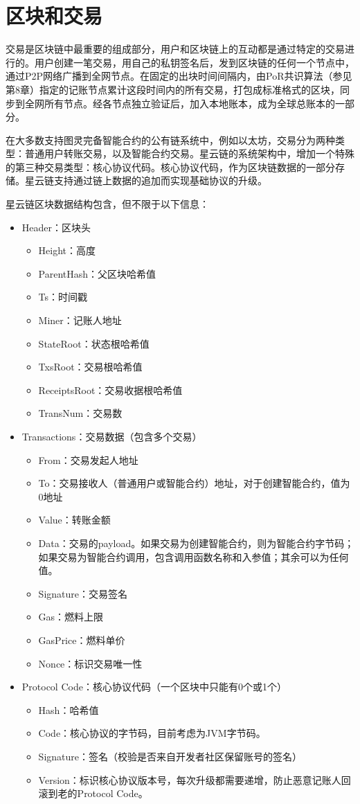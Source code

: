 \section{区块和交易}

交易是区块链中最重要的组成部分，用户和区块链上的互动都是通过特定的交易进行的。用户创建一笔交易，用自己的私钥签名后，发到区块链的任何一个节点中，通过P2P网络广播到全网节点。在固定的出块时间间隔内，由PoR共识算法（参见第8章）指定的记账节点累计这段时间内的所有交易，打包成标准格式的区块，同步到全网所有节点。经各节点独立验证后，加入本地账本，成为全球总账本的一部分。

在大多数支持图灵完备智能合约的公有链系统中，例如以太坊，交易分为两种类型：普通用户转账交易，以及智能合约交易。星云链的系统架构中，增加一个特殊的第三种交易类型：核心协议代码。核心协议代码，作为区块链数据的一部分存储。星云链支持通过链上数据的追加而实现基础协议的升级。

星云链区块数据结构包含，但不限于以下信息：
\begin{itemize}
	\item Header：区块头
		\begin{itemize}
		\item Height：高度
		\item ParentHash：父区块哈希值
		\item Ts：时间戳
		\item Miner：记账人地址
		\item StateRoot：状态根哈希值
		\item TxsRoot：交易根哈希值
		\item ReceiptsRoot：交易收据根哈希值
		\item TransNum：交易数
		\end{itemize}
	\item Transactions：交易数据（包含多个交易）
		\begin{itemize}
		\item From：交易发起人地址
		\item To：交易接收人（普通用户或智能合约）地址，对于创建智能合约，值为0地址
		\item Value：转账金额
		\item Data：交易的payload。如果交易为创建智能合约，则为智能合约字节码；如果交易为智能合约调用，包含调用函数名称和入参值；其余可以为任何值。
		\item Signature：交易签名
		\item Gas：燃料上限
		\item GasPrice：燃料单价
		\item Nonce：标识交易唯一性
		\end{itemize}
	\item Protocol Code：核心协议代码（一个区块中只能有0个或1个）
		\begin{itemize}
		\item Hash：哈希值
		\item Code：核心协议的字节码，目前考虑为JVM字节码。
		\item Signature：签名（校验是否来自开发者社区保留账号的签名）
		\item Version：标识核心协议版本号，每次升级都需要递增，防止恶意记账人回滚到老的Protocol Code。
		\end{itemize}
\end{itemize}

